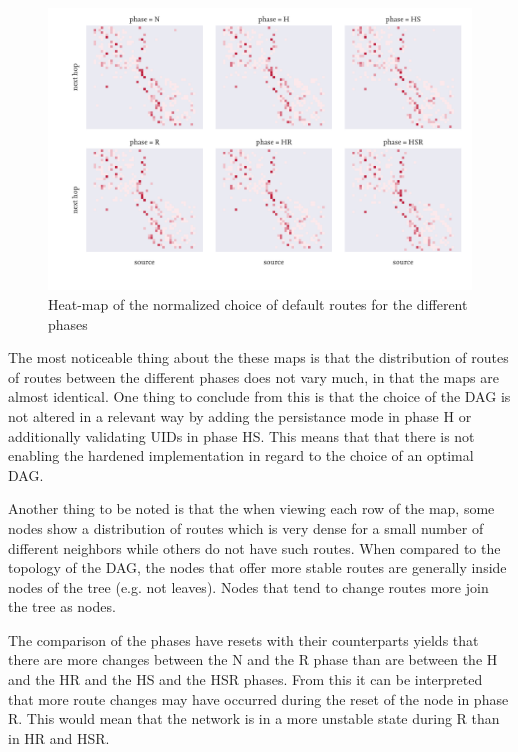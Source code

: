 \begin{figure}
  \centering
  \includegraphics[width=\textwidth]{../images/routes.pdf}
  \caption{Heat-map of the normalized choice of default routes for the different
    phases}
  \label{fig:hmroutes}
\end{figure}

The most noticeable thing about the these maps is that the distribution of
routes of routes between the different phases does not vary much, in that the
maps are almost identical. One thing to conclude from this is that the choice
of the \ac{DAG} is not altered in a relevant way by adding the persistance mode
in phase H or additionally validating \acp{UID} in phase HS. This means that
that there is not enabling the hardened implementation in regard to the choice of
an optimal \ac{DAG}.

Another thing to be noted is that the when viewing each row of the map, some
nodes show a distribution of routes which is very dense for a small number of
different neighbors while others do not have such routes. When compared to the
topology of the \ac{DAG}, the nodes that offer more stable routes are generally
inside nodes of the tree (e.g. not leaves). Nodes that tend to change
routes more join the tree as nodes.

The comparison of the phases have resets with their counterparts yields that there
are more changes between the N and the R phase than are between the H and the HR
and the HS and the HSR phases. From this it can be interpreted that more route
changes may have occurred during the reset of the node in phase R. This would
mean that the network is in a more unstable state during R than in HR and HSR.

